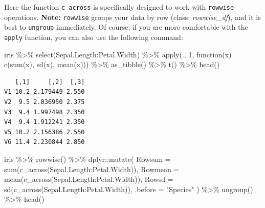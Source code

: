 \documentclass[
  letterpaper,
  DIV=11,
  numbers=noendperiod]{scrartcl}
\newenvironment{Shaded}{}{}
\newcommand{\AttributeTok}[1]{\textcolor[rgb]{0.65,0.15,0.64}{#1}}
\newcommand{\ControlFlowTok}[1]{\textcolor[rgb]{0.65,0.15,0.64}{#1}}
\newcommand{\DecValTok}[1]{\textcolor[rgb]{0.60,0.41,0.00}{#1}}
\newcommand{\FunctionTok}[1]{\textcolor[rgb]{0.25,0.47,0.95}{#1}}
\newcommand{\NormalTok}[1]{\textcolor[rgb]{0.22,0.23,0.26}{#1}}
\newcommand{\SpecialCharTok}[1]{\textcolor[rgb]{0.00,0.52,0.74}{#1}}
\newcommand{\StringTok}[1]{\textcolor[rgb]{0.31,0.63,0.31}{#1}}
\begin{document}
Here the function \texttt{c\_across} is specifically designed to work
with \texttt{rowwise} operations. \textbf{Note:} \texttt{rowwise} groups
your data by row (class: \emph{rowwise\_df}), and it is best to
\texttt{ungroup} immediately. Of course, if you are more comfortable
with the \texttt{apply} function, you can also use the following
command:

\begin{Shaded}
\begin{Highlighting}[]
\NormalTok{iris }\SpecialCharTok{\%\textgreater{}\%}
  \FunctionTok{select}\NormalTok{(Sepal.Length}\SpecialCharTok{:}\NormalTok{Petal.Width) }\SpecialCharTok{\%\textgreater{}\%}
  \FunctionTok{apply}\NormalTok{(., }\DecValTok{1}\NormalTok{, }\ControlFlowTok{function}\NormalTok{(x) }\FunctionTok{c}\NormalTok{(}\FunctionTok{sum}\NormalTok{(x), }\FunctionTok{sd}\NormalTok{(x), }\FunctionTok{mean}\NormalTok{(x))) }\SpecialCharTok{\%\textgreater{}\%}
  \FunctionTok{as\_tibble}\NormalTok{() }\SpecialCharTok{\%\textgreater{}\%}
  \FunctionTok{t}\NormalTok{() }\SpecialCharTok{\%\textgreater{}\%}
  \FunctionTok{head}\NormalTok{()}
\end{Highlighting}
\end{Shaded}

\begin{verbatim}
   [,1]     [,2]  [,3]
V1 10.2 2.179449 2.550
V2  9.5 2.036950 2.375
V3  9.4 1.997498 2.350
V4  9.4 1.912241 2.350
V5 10.2 2.156386 2.550
V6 11.4 2.230844 2.850
\end{verbatim}

\begin{Shaded}
\begin{Highlighting}[]
\NormalTok{iris }\SpecialCharTok{\%\textgreater{}\%}
  \FunctionTok{rowwise}\NormalTok{() }\SpecialCharTok{\%\textgreater{}\%}
\NormalTok{  dplyr}\SpecialCharTok{::}\FunctionTok{mutate}\NormalTok{(}
    \AttributeTok{Rowsum =} \FunctionTok{sum}\NormalTok{(}\FunctionTok{c\_across}\NormalTok{(Sepal.Length}\SpecialCharTok{:}\NormalTok{Petal.Width)),}
    \AttributeTok{Rowmean =} \FunctionTok{mean}\NormalTok{(}\FunctionTok{c\_across}\NormalTok{(Sepal.Length}\SpecialCharTok{:}\NormalTok{Petal.Width)),}
    \AttributeTok{Rowsd =} \FunctionTok{sd}\NormalTok{(}\FunctionTok{c\_across}\NormalTok{(Sepal.Length}\SpecialCharTok{:}\NormalTok{Petal.Width)),}
    \AttributeTok{.before =} \StringTok{"Species"}
\NormalTok{  ) }\SpecialCharTok{\%\textgreater{}\%}
  \FunctionTok{ungroup}\NormalTok{() }\SpecialCharTok{\%\textgreater{}\%}
  \FunctionTok{head}\NormalTok{()}
\end{Highlighting}
\end{Shaded}
\end{document}
